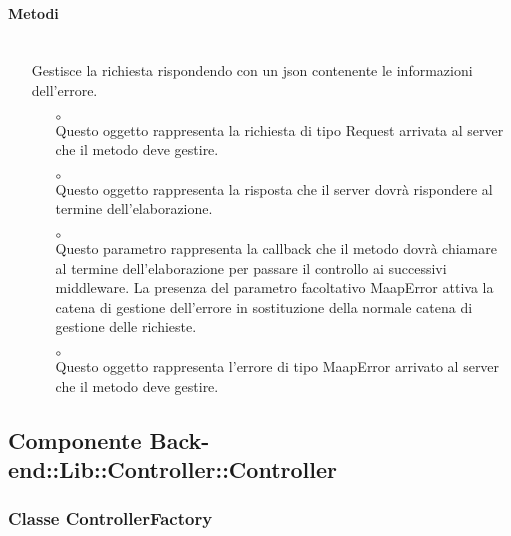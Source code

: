 \paragraph*{Metodi}
\begin{itemize}
\item[]  \\ Gestisce la richiesta rispondendo con un json contenente le informazioni dell'errore.
\begin{itemize}\addtolength{\itemsep}{-0.5\baselineskip}
\item[$\circ$]  \\ Questo oggetto rappresenta la richiesta di tipo Request arrivata al server che il metodo deve gestire.
\item[$\circ$]  \\ Questo oggetto rappresenta la risposta che il server dovrà rispondere al termine dell'elaborazione.
\item[$\circ$]  \\ Questo parametro rappresenta la callback che il metodo dovrà chiamare al termine dell'elaborazione per passare il controllo ai successivi middleware. La presenza del parametro facoltativo MaapError attiva la catena di gestione dell'errore in sostituzione della normale catena di gestione delle richieste.
\item[$\circ$]  \\ Questo oggetto rappresenta l'errore di tipo MaapError arrivato al server che il metodo deve gestire.
\end{itemize}
\end{itemize}

\subsection{Componente Back-end::Lib::Controller::Controller}

\subsubsection{Classe ControllerFactory}

